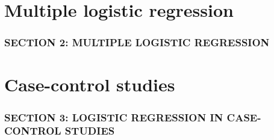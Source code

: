 \documentclass[12pt, 
hyperref={colorlinks=true, linkcolor=blue, urlcolor=cyan}]{beamer}
\begin{document}
\section{Multiple logistic regression}
\begin{frame}
\frametitle{SECTION 2: MULTIPLE LOGISTIC REGRESSION}
\end{frame}

\section{Case-control studies}
\begin{frame}
\frametitle{SECTION 3: LOGISTIC REGRESSION IN CASE-CONTROL STUDIES}
\end{frame}


\end{document}
